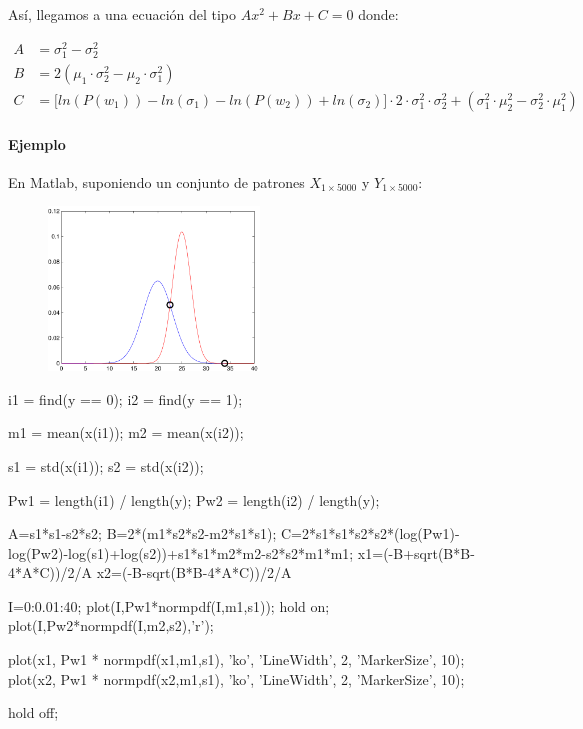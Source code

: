 \documentclass[11pt]{scrartcl}
\begin{document}
\begin{framed}
  Así, llegamos a una ecuación del tipo $Ax^2 + Bx + C = 0$ donde:

\begin{align*}
  A &= \sigma_1^2 - \sigma_2^2 \\
  B &= 2(\mu_1 \cdot \sigma_2^2 - \mu_2 \cdot \sigma_1^2) \\
  C &= \Big[ ln(P(w_1)) - ln(\sigma_1) - ln(P(w_2)) + ln(\sigma_2) \Big] \cdot 2
  \cdot \sigma_1^2 \cdot \sigma_2^2 + (\sigma_1^2 \cdot \mu_2^2 - \sigma_2^2
  \cdot \mu_1^2)
\end{align*}

\end{framed}

\paragraph{Ejemplo}

En Matlab, suponiendo un conjunto de patrones $X_{1 \times 5000}$ y $Y_{1 \times 5000}$:

\begin{figure}[h!]
  \centering
  \includegraphics[width=0.5\textwidth]{img/bayes_4}
\end{figure}

\begin{matlabcode}
i1 = find(y == 0);
i2 = find(y == 1);

m1 = mean(x(i1));
m2 = mean(x(i2));

s1 = std(x(i1));
s2 = std(x(i2));

Pw1 = length(i1) / length(y);
Pw2 = length(i2) / length(y);

A=s1*s1-s2*s2;
B=2*(m1*s2*s2-m2*s1*s1);
C=2*s1*s1*s2*s2*(log(Pw1)-log(Pw2)-log(s1)+log(s2))+s1*s1*m2*m2-s2*s2*m1*m1;
x1=(-B+sqrt(B*B-4*A*C))/2/A
x2=(-B-sqrt(B*B-4*A*C))/2/A

I=0:0.01:40;
plot(I,Pw1*normpdf(I,m1,s1));     hold on;
plot(I,Pw2*normpdf(I,m2,s2),'r'); 

plot(x1, Pw1 * normpdf(x1,m1,s1), 'ko', 'LineWidth', 2, 'MarkerSize', 10);
plot(x2, Pw1 * normpdf(x2,m1,s1), 'ko', 'LineWidth', 2, 'MarkerSize', 10);

hold off;  
\end{matlabcode}
\end{document}
